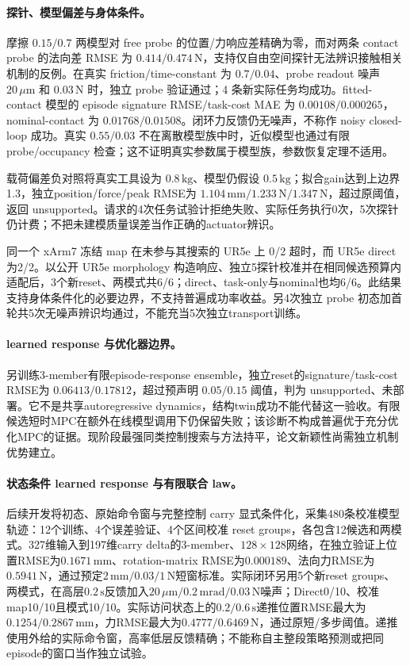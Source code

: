 \paragraph{探针、模型偏差与身体条件。}
摩擦 $0.15/0.7$ 两模型对 free probe 的位置/力响应差精确为零，而对两条 contact probe 的法向差 RMSE 为 $0.414/0.474\,\mathrm N$，支持仅自由空间探针无法辨识接触相关机制的反例。在真实 friction/time-constant 为 $0.7/0.04$、probe readout 噪声 $20\,\mu\mathrm m$ 和 $0.03\,\mathrm N$ 时，独立 probe 验证通过；4 条新实际任务均成功。fitted-contact 模型的 episode signature RMSE/task-cost MAE 为 $0.00108/0.000265$，nominal-contact 为 $0.01768/0.01508$。闭环力反馈仍无噪声，不称作 noisy closed-loop 成功。真实 $0.55/0.03$ 不在离散模型族中时，近似模型也通过有限 probe/occupancy 检查；这不证明真实参数属于模型族，参数恢复定理不适用。

载荷偏差负对照将真实工具设为 $0.8\,\mathrm{kg}$、模型仍假设 $0.5\,\mathrm{kg}$；拟合gain达到上边界1.3，独立position/force/peak RMSE为 $1.104\,\mathrm{mm}/1.233\,\mathrm N/1.347\,\mathrm N$，超过原阈值，返回 unsupported。请求的4次任务试验计拒绝失败、实际任务执行0次，5次探针仍计费；不把未建模质量误差当作正确的actuator辨识。

同一个 xArm7 冻结 map 在未参与其搜索的 UR5e 上 0/2 超时，而 UR5e direct 为2/2。以公开 UR5e morphology 构造响应、独立5探针校准并在相同候选预算内适配后，3个新reset、两模式共6/6；direct、task-only与nominal也均6/6。此结果支持身体条件化的必要边界，不支持普遍成功率收益。另4次独立 probe 初态加首轮共5次无噪声辨识均通过，不能充当5次独立transport训练。

\paragraph{learned response 与优化器边界。}
另训练3-member有限episode-response ensemble，独立reset的signature/task-cost RMSE为 $0.06413/0.17812$，超过预声明 $0.05/0.15$ 阈值，判为 unsupported、未部署。它不是共享autoregressive dynamics，结构twin成功不能代替这一验收。有限候选短时MPC在额外在线模型调用下仍保留失败；该诊断不构成普遍优于充分优化MPC的证据。现阶段最强同类控制搜索与方法持平，论文新颖性尚需独立机制优势建立。

\paragraph{状态条件 learned response 与有限联合 law。}
后续开发将初态、原始命令窗与完整控制 carry 显式条件化，采集480条校准模型轨迹：12个训练、4个误差验证、4个区间校准 reset groups，各包含12候选和两模式。327维输入到197维carry delta的3-member、$128\times128$网络，在独立验证上位置RMSE为$0.1671\,\mathrm{mm}$、rotation-matrix RMSE为$0.000189$、法向力RMSE为$0.5941\,\mathrm N$，通过预定$2\,\mathrm{mm}/0.03/1\,\mathrm N$短窗标准。实际闭环另用5个新reset groups、两模式，在高层$0.2\,\mathrm s$反馈加入$20\,\mu\mathrm m/0.2\,\mathrm{mrad}/0.03\,\mathrm N$噪声；Direct0/10、校准map10/10且模式10/10。实际访问状态上的$0.2/0.6\,\mathrm s$递推位置RMSE最大为$0.1254/0.2867\,\mathrm{mm}$，力RMSE最大为$0.4777/0.6469\,\mathrm N$，通过原短/多步阈值。递推使用外给的实际命令窗，高率低层反馈精确；不能称自主整段策略预测或把同episode的窗口当作独立试验。

